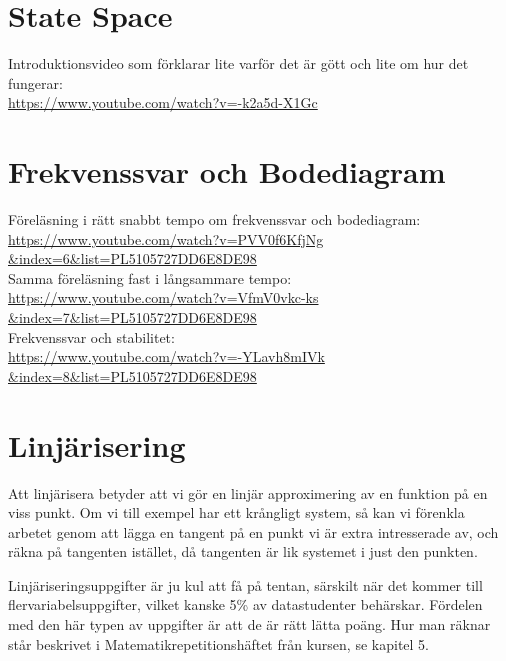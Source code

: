 \documentclass[a4paper]{article}
\begin{document}
\section{State Space}
Introduktionsvideo som förklarar lite varför det är gött och lite om hur det fungerar:\\
\href{https://www.youtube.com/watch?v=-k2a5d-X1Gc}{https://www.youtube.com/watch?v=-k2a5d-X1Gc}


\section{Frekvenssvar och Bodediagram}
Föreläsning i rätt snabbt tempo om frekvenssvar och bodediagram:\\
\href{https://www.youtube.com/watch?v=PVV0f6KfjNg&index=6&list=PL5105727DD6E8DE98}{https://www.youtube.com/watch?v=PVV0f6KfjNg\\\&index=6\&list=PL5105727DD6E8DE98}\\

Samma föreläsning fast i långsammare tempo:\\
\href{https://www.youtube.com/watch?v=VfmV0vkc-ks&index=7&list=PL5105727DD6E8DE98}{https://www.youtube.com/watch?v=VfmV0vkc-ks\\\&index=7\&list=PL5105727DD6E8DE98}\\

Frekvenssvar och stabilitet:\\
\href{https://www.youtube.com/watch?v=-YLavh8mIVk&index=8&list=PL5105727DD6E8DE98}{https://www.youtube.com/watch?v=-YLavh8mIVk\\\&index=8\&list=PL5105727DD6E8DE98}


\section{Linjärisering}
\label{sec:linjärisering}
Att linjärisera betyder att vi gör en linjär approximering av en funktion på en viss punkt. Om vi till exempel har ett krångligt system, så kan vi förenkla arbetet genom att lägga en tangent på en punkt vi är extra intresserade av, och räkna på tangenten istället, då tangenten är lik systemet i just den punkten.

Linjäriseringsuppgifter är ju kul att få på tentan, särskilt när det kommer till flervariabelsuppgifter, vilket kanske 5\% av datastudenter behärskar. Fördelen med den här typen av uppgifter är att de är rätt lätta poäng. Hur man räknar står beskrivet i Matematikrepetitionshäftet från kursen, se kapitel 5.
\end{document}
